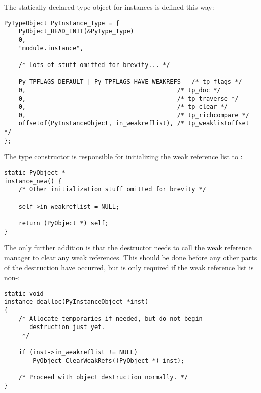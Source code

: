 The statically-declared type object for instances is defined this way:

\begin{verbatim}
PyTypeObject PyInstance_Type = {
    PyObject_HEAD_INIT(&PyType_Type)
    0,
    "module.instance",

    /* Lots of stuff omitted for brevity... */

    Py_TPFLAGS_DEFAULT | Py_TPFLAGS_HAVE_WEAKREFS   /* tp_flags */
    0,                                          /* tp_doc */
    0,                                          /* tp_traverse */
    0,                                          /* tp_clear */
    0,                                          /* tp_richcompare */
    offsetof(PyInstanceObject, in_weakreflist), /* tp_weaklistoffset */
};
\end{verbatim}

The type constructor is responsible for initializing the weak reference
list to \NULL:

\begin{verbatim}
static PyObject *
instance_new() {
    /* Other initialization stuff omitted for brevity */

    self->in_weakreflist = NULL;

    return (PyObject *) self;
}
\end{verbatim}

The only further addition is that the destructor needs to call the
weak reference manager to clear any weak references.  This should be
done before any other parts of the destruction have occurred, but is
only required if the weak reference list is non-\NULL:

\begin{verbatim}
static void
instance_dealloc(PyInstanceObject *inst)
{
    /* Allocate temporaries if needed, but do not begin
       destruction just yet.
     */

    if (inst->in_weakreflist != NULL)
        PyObject_ClearWeakRefs((PyObject *) inst);

    /* Proceed with object destruction normally. */
}
\end{verbatim}
